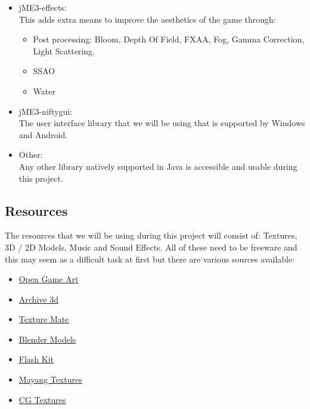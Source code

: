 \documentclass[letterpaper]{article}
\begin{document}
\begin{itemize}
				\item jME3-effects:\\
					This adds extra means to improve the aesthetics of the game through:
						\begin{itemize}
							\item Post processing: Bloom, Depth Of Field, FXAA, Fog, Gamma Correction, Light Scattering.
							\item SSAO
							\item Water
						\end{itemize}
					
				\item jME3-niftygui: \\
					The user interface library that we will be using that is supported by Windows and Android.
				
				\item Other: \\
				Any other library natively supported in Java is accessible and usable during this project.
			
			\end{itemize}
			
			\vspace{0.1cm}
			
			\subsection*{Resources}
			
			\vspace{0.1cm}
			
			The resources that we will be using during this project will consist of: Textures, 3D / 2D Models, Music and Sound Effects. All of these need to be freeware and this may seem as a difficult task at first but there are various sources available:
			\begin{itemize}
				\item \href{http://www.opengameart.org}{Open Game Art}
				\item \href{http://www.archive3d.net}{Archive 3d}
				\item \href{http://www.texturemate.com}{Texture Mate}
				\item \href{http://www.blender-models.com}{Blender Models}
				\item \href{http://www.flashkit.com}{Flash Kit}
				\item \href{http://www.mayang.com/textures/}{Mayang Textures}
				\item \href{http://www.cgtextures.com}{CG Textures}
			\end{itemize}
\end{document}
